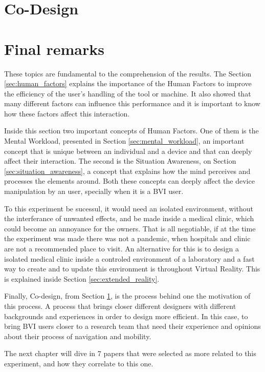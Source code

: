         

\section{Co-Design}
\label{sec:co_design}

    

\section{Final remarks}
\label{sec:final_remarks2}


These topics are fundamental to the comprehension of the results. The Section \ref{sec:human_factors} explains the importance of the Human Factors to improve the efficiency of the user's handling of the tool or machine. It also showed that many different factors can influence this performance and it is important to know how these factors affect this interaction.

Inside this section two important concepts of Human Factors. One of them is the Mental Workload, presented in Section \ref{sec:mental_workload}, an important concept that is unique between an individual and a device and that can deeply affect their interaction. The second is the Situation Awareness, on Section \ref{sec:situation_awareness}, a concept that explains how the mind perceives and processes the elements around. Both these concepts can deeply affect the device manipulation by an user, specially when it is a BVI user.

To this experiment be sucessul, it would need an isolated environment, without the interferance of unwanted effects, and be made inside a medical clinic, which could become an annoyance for the owners. That is all negotiable, if at the time the experiment was made there was not a pandemic, when hospitals and clinic are not a recommended place to visit. An alternative for this is to design a isolated medical clinic inside a controled environment of a laboratory and a fast way to create and to update this environment is throughout Virtual Reality. This is explained inside Section \ref{sec:extended_reality}.

Finally, Co-design, from Section \ref{sec:co_design}, is the process behind one the motivation of this process. A process that brings closer different designers with different backgrounds and experiences in order to design more efficient. In this case, to bring BVI users closer to a research team that need their experience and opinions about their process of navigation and mobility.

The next chapter will dive in 7 papers that were selected as more related to this experiment, and how they correlate to this one.
